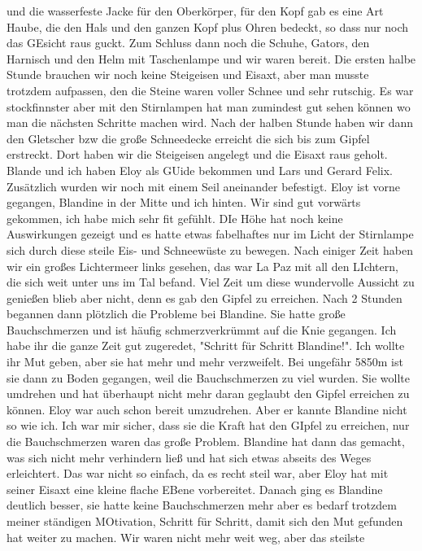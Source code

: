 \documentclass[11pt]{book}
\begin{document}
und die wasserfeste Jacke für den Oberkörper, für den Kopf gab es eine Art Haube, die den Hals und den ganzen Kopf plus Ohren bedeckt, so dass nur noch 
das GEsicht raus guckt. Zum Schluss dann noch die Schuhe, Gators, den Harnisch und den Helm mit Taschenlampe und wir waren bereit. Die ersten halbe Stunde 
brauchen wir noch keine Steigeisen und Eisaxt, aber man musste trotzdem aufpassen, den die Steine waren voller Schnee und sehr rutschig. Es war stockfinnster 
aber mit den Stirnlampen hat man zumindest gut sehen können wo man die nächsten Schritte machen wird. Nach der halben Stunde haben wir dann den Gletscher 
bzw die große Schneedecke erreicht die sich bis zum Gipfel erstreckt. Dort haben wir die Steigeisen angelegt und die Eisaxt raus geholt. Blande und ich 
haben Eloy als GUide bekommen und Lars und Gerard Felix. Zusätzlich wurden wir noch mit einem Seil aneinander befestigt. Eloy ist vorne gegangen, Blandine 
in der Mitte und ich hinten. Wir sind gut vorwärts gekommen, ich habe mich sehr fit gefühlt. DIe Höhe hat noch keine Auswirkungen gezeigt und es hatte 
etwas fabelhaftes nur im Licht der Stirnlampe sich durch diese steile Eis- und Schneewüste zu bewegen. Nach einiger Zeit haben wir ein großes Lichtermeer 
links gesehen, das war La Paz mit all den LIchtern, die sich weit unter uns im Tal befand. Viel Zeit um diese wundervolle Aussicht zu genießen blieb aber nicht, 
denn es gab den Gipfel zu erreichen. Nach 2 Stunden begannen dann plötzlich die Probleme bei Blandine. Sie hatte große Bauchschmerzen und ist häufig 
schmerzverkrümmt auf die Knie gegangen. Ich habe ihr die ganze Zeit gut zugeredet, "Schritt für Schritt Blandine!". Ich wollte ihr Mut geben, aber sie 
hat mehr und mehr verzweifelt. Bei ungefähr 5850m ist sie dann zu Boden gegangen, weil die Bauchschmerzen zu viel wurden. Sie wollte umdrehen und hat 
überhaupt nicht mehr daran geglaubt den Gipfel erreichen zu können. Eloy war auch schon bereit umzudrehen. Aber er kannte Blandine nicht so wie ich. 
Ich war mir sicher, dass sie die Kraft hat den GIpfel zu erreichen, nur die Bauchschmerzen waren das große Problem. Blandine hat dann das gemacht, was 
sich nicht mehr verhindern ließ und hat sich etwas abseits des Weges erleichtert. Das war nicht so einfach, da es recht steil war, aber Eloy hat mit 
seiner Eisaxt eine kleine flache EBene vorbereitet. Danach ging es Blandine deutlich besser, sie hatte keine Bauchschmerzen mehr aber es bedarf trotzdem 
meiner ständigen MOtivation, Schritt für Schritt, damit sich den Mut gefunden hat weiter zu machen. Wir waren nicht mehr weit weg, aber das steilste 
\end{document}
